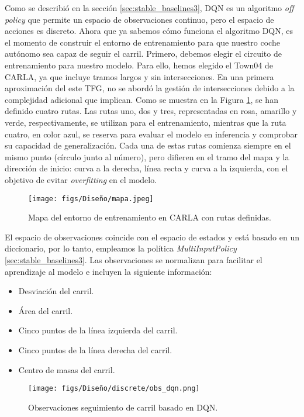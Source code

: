 Como se describió en la sección \ref{sec:stable_baselines3}, \ac{DQN} es un algoritmo \textit{off policy} que permite un espacio de observaciones continuo, pero el espacio de acciones es discreto. Ahora que ya sabemos cómo funciona el algoritmo \ac{DQN}, es el momento de construir el entorno de entrenamiento para que nuestro coche autónomo sea capaz de seguir el carril. Primero, debemos elegir el circuito de entrenamiento para nuestro modelo. Para ello, hemos elegido el Town04 de CARLA, ya que incluye tramos largos y sin intersecciones. En una primera aproximación del este \ac{TFG}, no se abordó la gestión de intersecciones debido a la complejidad adicional que implican. Como se muestra en la Figura \ref{fig:mapa}, se han definido cuatro rutas. Las rutas uno, dos y tres, representadas en rosa, amarillo y verde, respectivamente, se utilizan para el entrenamiento, mientras que la ruta cuatro, en color azul, se reserva para evaluar el modelo en inferencia y comprobar su capacidad de generalización. Cada una de estas rutas comienza siempre en el mismo punto (círculo junto al número), pero difieren en el tramo del mapa y la dirección de inicio: curva a la derecha, línea recta y curva a la izquierda, con el objetivo de evitar \textit{overfitting} en el modelo.

\begin{figure}[ht]
  \centering
  \texttt{[image: figs/Diseño/mapa.jpeg]}
  \caption{Mapa del entorno de entrenamiento en CARLA con rutas definidas.}
  \label{fig:mapa}
\end{figure}

\newpage

El espacio de observaciones coincide con el espacio de estados y está basado en un diccionario, por lo tanto, empleamos la política \textit{MultiInputPolicy} \ref{sec:stable_baselines3}. Las observaciones se normalizan para facilitar el aprendizaje al modelo e incluyen la siguiente información: 
\begin{itemize}
		\item Desviación del carril.
		\item Área del carril.
		\item Cinco puntos de la línea izquierda del carril.
		\item Cinco puntos de la línea derecha del carril.
		\item Centro de masas del carril.
\end{itemize}

\begin{figure}[ht]
  \centering
  \texttt{[image: figs/Diseño/discrete/obs\_dqn.png]}
  \caption{Observaciones seguimiento de carril basado en \ac{DQN}.}
  \label{fig:dqn_obs}
\end{figure}

